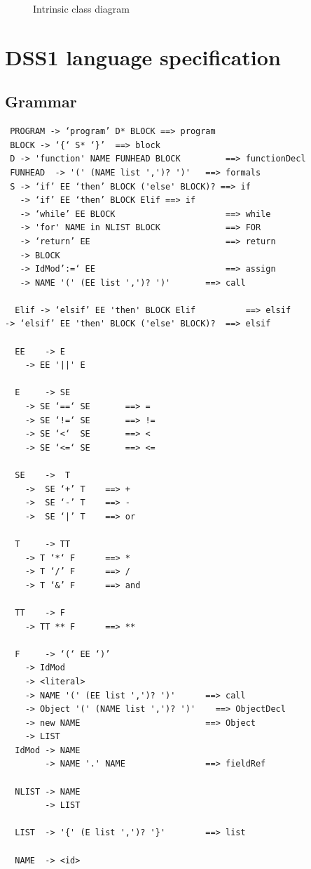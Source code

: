 \documentclass[12pt,letterpaper]{article}
\begin{document}
{\begin{figure}
\begin{center}
\begin{tikzpicture}[node distance=0.25in]
\end{tikzpicture}
\end{center}
\caption{Intrinsic class diagram}
\label{fig:INTRINSIC_DIAGRAM}
\end{figure}

\newpage \appendix 
\section{DSS1 language specification}

\subsection{Grammar}

\begin{verbatim}
 PROGRAM -> ‘program’ D* BLOCK ==> program
 BLOCK -> ‘{‘ S* ‘}’  ==> block
 D -> 'function' NAME FUNHEAD BLOCK      	==> functionDecl
 FUNHEAD  -> '(' (NAME list ',')? ')'  	==> formals
 S -> ‘if’ EE ‘then’ BLOCK ('else' BLOCK)? ==> if 
   -> ‘if’ EE ‘then’ BLOCK Elif ==> if 
   -> ‘while’ EE BLOCK               		==> while
   -> 'for' NAME in NLIST BLOCK     		==> FOR
   -> ‘return’ EE                    		==> return
   -> BLOCK
   -> IdMod’:=‘ EE                    		==> assign
   -> NAME '(' (EE list ',')? ')' 		==> call
 
  Elif -> ‘elsif’ EE 'then' BLOCK Elif			==> elsif
-> ‘elsif’ EE 'then' BLOCK ('else' BLOCK)?	==> elsif
  
  EE 	-> E
  	-> EE '||' E
  
  E 	-> SE
  	-> SE ‘==‘ SE   	==> =
  	-> SE ‘!=‘ SE   	==> !=
  	-> SE ‘<‘  SE   	==> <
  	-> SE ‘<=‘ SE   	==> <=
 
  SE 	->  T
  	->  SE ‘+’ T  	==> +
  	->  SE ‘-’ T  	==> -
  	->  SE ‘|’ T  	==> or
 
  T  	-> TT
  	-> T ‘*‘ F  	==> *
  	-> T ‘/’ F  	==> /
  	-> T ‘&’ F  	==> and
 
  TT 	-> F
  	-> TT ** F    	==> **
 
  F  	-> ‘(‘ EE ‘)’
  	-> IdMod 
  	-> <literal>
  	-> NAME '(' (EE list ',')? ')' 		==> call
  	-> Object '(' (NAME list ',')? ')'    ==> ObjectDecl
  	-> new NAME          				==> Object
  	-> LIST
  IdMod -> NAME
        -> NAME '.' NAME    			==> fieldRef
  
  NLIST	-> NAME
       	-> LIST
  
  LIST	-> '{' (E list ',')? '}'   		==> list
 
  NAME	-> <id>
\end{verbatim}

}
\end{document}
